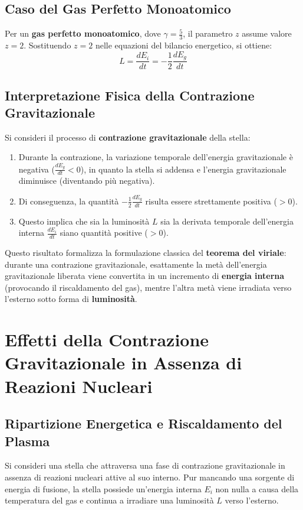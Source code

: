 \subsection{Caso del Gas Perfetto Monoatomico}
Per un \textbf{gas perfetto monoatomico}, dove $\gamma = \frac{5}{3}$, il parametro $z$ assume valore $z = 2$. Sostituendo $z = 2$ nelle equazioni del bilancio energetico, si ottiene:
\begin{equation}
L = \frac{d E_i}{dt} = -\frac{1}{2} \frac{d E_g}{dt}
\end{equation}

\subsection{Interpretazione Fisica della Contrazione Gravitazionale}
Si consideri il processo di \textbf{contrazione gravitazionale} della stella:
\begin{enumerate}
\item Durante la contrazione, la variazione temporale dell'energia gravitazionale è negativa ($\frac{d E_g}{dt} < 0$), in quanto la stella si addensa e l'energia gravitazionale diminuisce (diventando più negativa).
\item Di conseguenza, la quantità $-\frac{1}{2} \frac{d E_g}{dt}$ risulta essere strettamente positiva ($> 0$).
\item Questo implica che sia la luminosità $L$ sia la derivata temporale dell'energia interna $\frac{d E_i}{dt}$ siano quantità positive ($> 0$).
\end{enumerate}

Questo risultato formalizza la formulazione classica del \textbf{teorema del viriale}: durante una contrazione gravitazionale, esattamente la metà dell'energia gravitazionale liberata viene convertita in un incremento di \textbf{energia interna} (provocando il riscaldamento del gas), mentre l'altra metà viene irradiata verso l'esterno sotto forma di \textbf{luminosità}.

\section{Effetti della Contrazione Gravitazionale in Assenza di Reazioni Nucleari}

\subsection{Ripartizione Energetica e Riscaldamento del Plasma}
Si consideri una stella che attraversa una fase di contrazione gravitazionale in assenza di reazioni nucleari attive al suo interno. Pur mancando una sorgente di energia di fusione, la stella possiede un'energia interna $E_i$ non nulla a causa della temperatura del gas e continua a irradiare una luminosità $L$ verso l'esterno.

